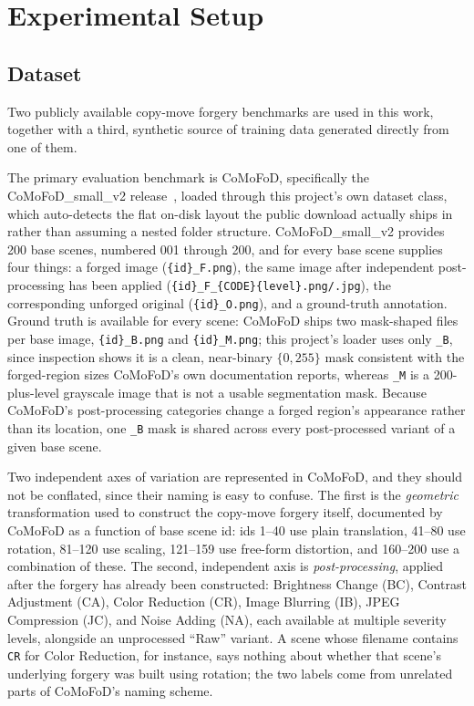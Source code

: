 \documentclass[conference]{IEEEtran}
\begin{document}
\section{Experimental Setup}\label{sec:setup}

\subsection{Dataset}
Two publicly available copy-move forgery benchmarks are used in this work, together with a third, synthetic source of training data generated directly from one of them.

The primary evaluation benchmark is CoMoFoD, specifically the CoMoFoD\_small\_v2 release~\cite{comofod2013}, loaded through this project's own dataset class, which auto-detects the flat on-disk layout the public download actually ships in rather than assuming a nested folder structure. CoMoFoD\_small\_v2 provides 200 base scenes, numbered 001 through 200, and for every base scene supplies four things: a forged image (\texttt{\{id\}\_F.png}), the same image after independent post-processing has been applied (\texttt{\{id\}\_F\_\{CODE\}\{level\}.png/.jpg}), the corresponding unforged original (\texttt{\{id\}\_O.png}), and a ground-truth annotation. Ground truth is available for every scene: CoMoFoD ships two mask-shaped files per base image, \texttt{\{id\}\_B.png} and \texttt{\{id\}\_M.png}; this project's loader uses only \texttt{\_B}, since inspection shows it is a clean, near-binary $\{0, 255\}$ mask consistent with the forged-region sizes CoMoFoD's own documentation reports, whereas \texttt{\_M} is a 200-plus-level grayscale image that is not a usable segmentation mask. Because CoMoFoD's post-processing categories change a forged region's appearance rather than its location, one \texttt{\_B} mask is shared across every post-processed variant of a given base scene.

Two independent axes of variation are represented in CoMoFoD, and they should not be conflated, since their naming is easy to confuse. The first is the \emph{geometric} transformation used to construct the copy-move forgery itself, documented by CoMoFoD as a function of base scene id: ids 1--40 use plain translation, 41--80 use rotation, 81--120 use scaling, 121--159 use free-form distortion, and 160--200 use a combination of these. The second, independent axis is \emph{post-processing}, applied after the forgery has already been constructed: Brightness Change (BC), Contrast Adjustment (CA), Color Reduction (CR), Image Blurring (IB), JPEG Compression (JC), and Noise Adding (NA), each available at multiple severity levels, alongside an unprocessed ``Raw'' variant. A scene whose filename contains \texttt{CR} for Color Reduction, for instance, says nothing about whether that scene's underlying forgery was built using rotation; the two labels come from unrelated parts of CoMoFoD's naming scheme.
\end{document}
